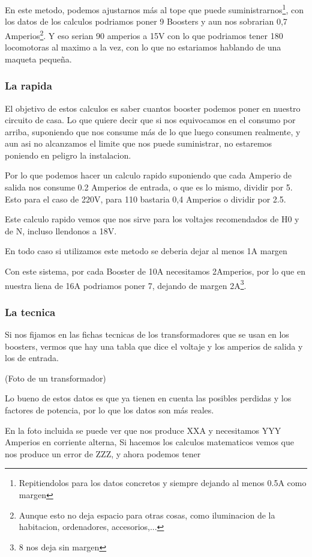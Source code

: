 En este metodo, podemos ajustarnos más al tope que puede suministrarnos\footnote{Repitiendolos para los datos concretos y siempre dejando al menos 0.5A como margen}, con los datos de los calculos podriamos poner 9 Boosters y aun nos sobrarian 0,7 Amperios\footnote{Aunque esto no deja espacio para otras cosas, como iluminacion de la habitacion, ordenadores, accesorios,...}. Y eso serian 90 amperios a 15V con lo que podriamos tener 180 locomotoras al maximo a la vez, con lo que no estariamos hablando de una maqueta pequeña.

\subsubsection{La rapida}

El objetivo de estos calculos es saber cuantos booster podemos poner en nuestro circuito de casa. Lo que quiere decir que si nos equivocamos en el consumo por arriba, suponiendo que nos consume más de lo que luego consumen realmente, y aun asi no alcanzamos el limite que nos puede suministrar, no estaremos poniendo en peligro la instalacion.

Por lo que podemos hacer un calculo rapido suponiendo que cada Amperio de salida nos consume 0.2 Amperios de entrada, o que es lo mismo, dividir por 5. Esto para el caso de 220V, para 110 bastaria 0,4 Amperios o dividir por 2.5. 

Este calculo rapido vemos que nos sirve para los voltajes recomendados de H0 y de N, incluso llendonos a 18V.

En todo caso si utilizamos este metodo se deberia dejar al menos 1A margen

Con este sistema, por cada Booster de 10A necesitamos 2Amperios, por lo que en nuestra liena de 16A podriamos poner 7, dejando de margen 2A\footnote{8 nos deja sin margen}.

\subsubsection{La tecnica}
Si nos fijamos en las fichas tecnicas de los transformadores que se usan en los boosters, vermos que hay una tabla que dice el voltaje y los amperios de salida y los de entrada.

(Foto de un transformador)

Lo bueno de estos datos es que ya tienen en cuenta las posibles perdidas y los factores de potencia, por lo que los datos son más reales.

En la foto incluida se puede ver que nos produce XXA y necesitamos YYY Amperios en corriente alterna, Si hacemos los calculos matematicos vemos que nos produce un error de ZZZ, y ahora podemos tener

